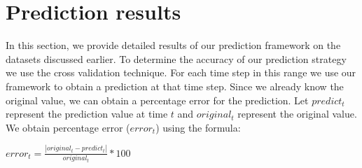 \noindent
\section{Prediction results}
\label{result}
In this section, we provide detailed results of our prediction framework on the datasets discussed earlier.
To determine the accuracy of our prediction strategy we use the cross validation technique.  
For each time step in this range we 
use our framework to obtain a prediction at that time step. Since we already know the original value, we can obtain a percentage error for the prediction.
Let $predict_{t}$ represent the prediction value at time $t$ and $original_{t}$ represent the original value. We obtain percentage error ($error_{t}$) using the formula:
\begin{center}
 {\large$error_{t}=\frac{|original_{t}-predict_{t}|}{original_{t}}*100$}
\end{center}




